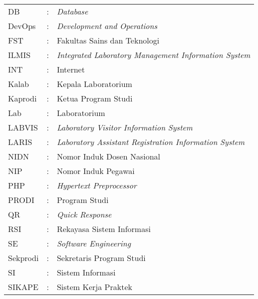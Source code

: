 \begin{tabular}{lll}
	DB             & : & \textit{Database}                                             \\
	DevOps         & : & \textit{Development and Operations}                           \\
	FST            & : & Fakultas Sains dan Teknologi                                  \\
	ILMIS          & : & \textit{Integrated Laboratory Management Information System}  \\
	INT            & : & Internet                                                      \\
	Kalab          & : & Kepala Laboratorium                                           \\
	Kaprodi        & : & Ketua Program Studi                                           \\
	Lab            & : & Laboratorium                                                  \\
	LABVIS         & : & \textit{Laboratory Visitor Information System}                \\
	LARIS          & : & \textit{Laboratory Assistant Registration Information System} \\
	NIDN           & : & Nomor Induk Dosen Nasional                                    \\
	NIP            & : & Nomor Induk Pegawai                                           \\
	PHP            & : & \textit{Hypertext Preprocessor}                               \\
	PRODI          & : & Program Studi                                                 \\
	QR             & : & \textit{Quick Response}                                       \\
	RSI            & : & Rekayasa Sistem Informasi                                     \\
	SE             & : & \textit{Software Engineering}                                 \\
	Sekprodi       & : & Sekretaris Program Studi                                      \\
	SI             & : & Sistem Informasi                                              \\
	SIKAPE         & : & Sistem Kerja Praktek                                          \\

\end{tabular}
